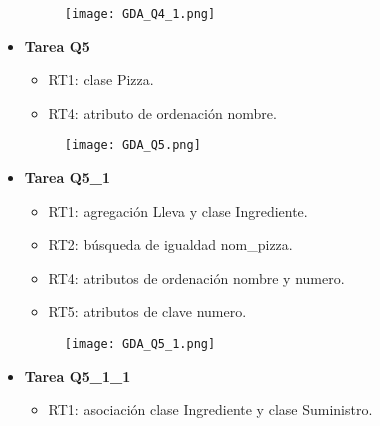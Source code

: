 \documentclass[a4paper]{article}
\begin{document}
\begin{itemize}
\begin{itemize}
    \end{itemize}

    \begin{figure}[H]
        \centering
        \texttt{[image: GDA\_Q4\_1.png]}
        \label{fig:Q4_1}
    \end{figure}

    \item \textbf{\large{Tarea Q5}}

    \begin{itemize}

        \item RT1: clase Pizza.

        \item RT4: atributo de ordenación nombre.

    \end{itemize}

    \begin{figure}[H]
        \centering
        \texttt{[image: GDA\_Q5.png]}
        \label{fig:Q5}
    \end{figure}

\newpage

    \item \textbf{\large{Tarea Q5\_1}}

    \begin{itemize}

        \item RT1: agregación Lleva y clase Ingrediente.

        \item RT2: búsqueda de igualdad nom\_pizza.

        \item RT4: atributos de ordenación nombre y numero.

        \item RT5: atributos de clave numero.

    \end{itemize}

    \begin{figure}[H]
        \centering
        \texttt{[image: GDA\_Q5\_1.png]}
        \label{fig:Q5_1}
    \end{figure}

    \item \textbf{\large{Tarea Q5\_1\_1}}

    \begin{itemize}

        \item RT1: asociación clase Ingrediente y clase Suministro.


\end{itemize}
\end{itemize}
\end{document}

